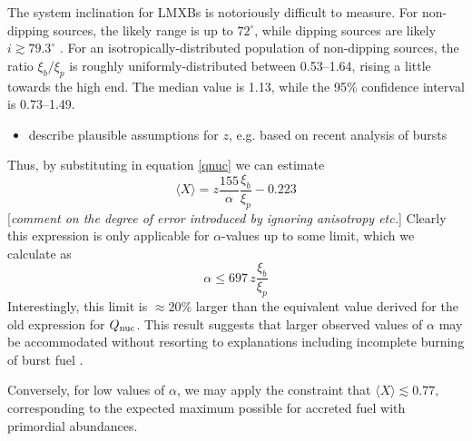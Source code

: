 \documentclass{aastex63}
\begin{document}
The system inclination for LMXBs is notoriously difficult to measure. For non-dipping sources, the likely range is up to $72^\circ$, while dipping sources are likely $i\gtrsim79.3^\circ$ \cite[]{gal16a}.
% 
For an isotropically-distributed population of non-dipping sources, the ratio $\xi_b/\xi_p$ is roughly uniformly-distributed between 0.53--1.64, rising a little towards the high end. The median value is 1.13, while the 95\% confidence interval is 0.73--1.49.

\begin{itemize}
\item describe plausible assumptions for $z$, e.g. based on recent analysis of bursts
\end{itemize}

Thus, by substituting in equation \ref{qnuc} we can estimate 
\begin{equation}
\langle X\rangle 
 = z\frac{155}{\alpha}\frac{\xi_b}{\xi_p} - 0.223 \label{xbar}
\end{equation}
[{\it comment on the degree of error introduced by ignoring anisotropy etc.}] 
%
Clearly this expression is only applicable for $\alpha$-values up to some limit, which we calculate as
\begin{equation}
\alpha \leq 697\, z \frac{\xi_b}{\xi_p}
\end{equation}
Interestingly, this limit is 
$\approx20$\%
%
larger than the equivalent value derived for the old expression for $Q_{\rm nuc}$. This result suggests that larger observed values of $\alpha$ may be accommodated without resorting to explanations including incomplete burning of burst fuel \cite[e.g.][]{bcatalog}.

Conversely, for low values of $\alpha$, we may apply the constraint that $\langle X\rangle \lesssim 0.77$, corresponding to the expected maximum possible for accreted fuel with primordial abundances.
\end{document}
